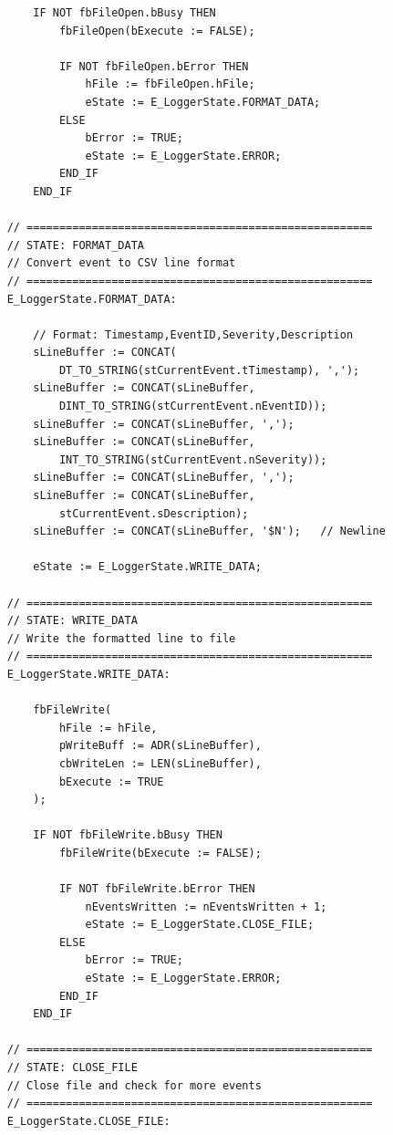 \documentclass[11pt,a4paper]{article}
\begin{document}
\begin{lstlisting}
        IF NOT fbFileOpen.bBusy THEN
            fbFileOpen(bExecute := FALSE);
            
            IF NOT fbFileOpen.bError THEN
                hFile := fbFileOpen.hFile;
                eState := E_LoggerState.FORMAT_DATA;
            ELSE
                bError := TRUE;
                eState := E_LoggerState.ERROR;
            END_IF
        END_IF
        
    // =====================================================
    // STATE: FORMAT_DATA
    // Convert event to CSV line format
    // =====================================================
    E_LoggerState.FORMAT_DATA:
        
        // Format: Timestamp,EventID,Severity,Description
        sLineBuffer := CONCAT(
            DT_TO_STRING(stCurrentEvent.tTimestamp), ',');
        sLineBuffer := CONCAT(sLineBuffer, 
            DINT_TO_STRING(stCurrentEvent.nEventID));
        sLineBuffer := CONCAT(sLineBuffer, ',');
        sLineBuffer := CONCAT(sLineBuffer, 
            INT_TO_STRING(stCurrentEvent.nSeverity));
        sLineBuffer := CONCAT(sLineBuffer, ',');
        sLineBuffer := CONCAT(sLineBuffer, 
            stCurrentEvent.sDescription);
        sLineBuffer := CONCAT(sLineBuffer, '$N');   // Newline
        
        eState := E_LoggerState.WRITE_DATA;
        
    // =====================================================
    // STATE: WRITE_DATA
    // Write the formatted line to file
    // =====================================================
    E_LoggerState.WRITE_DATA:
        
        fbFileWrite(
            hFile := hFile,
            pWriteBuff := ADR(sLineBuffer),
            cbWriteLen := LEN(sLineBuffer),
            bExecute := TRUE
        );
        
        IF NOT fbFileWrite.bBusy THEN
            fbFileWrite(bExecute := FALSE);
            
            IF NOT fbFileWrite.bError THEN
                nEventsWritten := nEventsWritten + 1;
                eState := E_LoggerState.CLOSE_FILE;
            ELSE
                bError := TRUE;
                eState := E_LoggerState.ERROR;
            END_IF
        END_IF
        
    // =====================================================
    // STATE: CLOSE_FILE
    // Close file and check for more events
    // =====================================================
    E_LoggerState.CLOSE_FILE:
        

\end{lstlisting}
\end{document}
